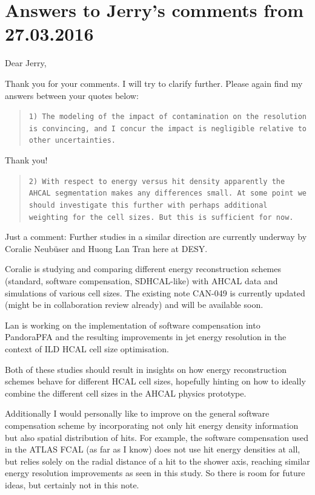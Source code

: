 \documentclass[twoside,a4paper,12pt]{article}
\begin{document}




\section*{Answers to Jerry's comments from 27.03.2016}
Dear Jerry,

Thank you for your comments. I will try to clarify further. 
Please again find my answers between your quotes below:


\begin{quote}\texttt{1) The modeling of the impact of contamination on the resolution is
convincing, and I concur the impact is negligible relative to other
uncertainties.}\end{quote}
Thank you!

\begin{quote}\texttt{2) With respect to energy versus hit density apparently the AHCAL
segmentation makes any differences small.   At some point we should
investigate this further with perhaps additional weighting for the cell
sizes.  But this is sufficient for now.}\end{quote}
Just a comment: Further studies in a similar direction are currently underway by Coralie Neub\"user and Huong Lan Tran here at DESY. 

Coralie is studying and comparing different energy reconstruction schemes (standard, software compensation, SDHCAL-like) with AHCAL data and simulations of various cell sizes. The existing note CAN-049 is currently updated (might be in collaboration review already) and will be available soon.

Lan is working on the implementation of software compensation into PandoraPFA and the resulting improvements in jet energy resolution in the context of ILD HCAL cell size optimisation.

Both of these studies should result in insights on how energy reconstruction schemes behave for different HCAL cell sizes, hopefully hinting on how to ideally combine the different cell sizes in the AHCAL physics prototype.  

Additionally I would personally like to improve on the general software compensation scheme by incorporating not only hit energy density information but also spatial distribution of hits. For example, the software compensation used in the ATLAS FCAL (as far as I know) does not use hit energy densities at all, but relies solely on the radial distance of a hit to the shower axis, reaching similar energy resolution improvements as seen in this study. So there is room for future ideas, but certainly not in this note.
\end{document}
